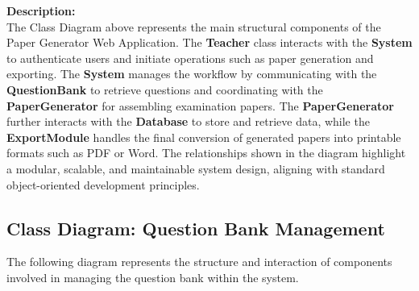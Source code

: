 \documentclass[12pt]{article}
\begin{document}
\begin{center}
\end{center}

\noindent
\textbf{Description:} \\
The Class Diagram above represents the main structural components of the Paper Generator Web Application. The \textbf{Teacher} class interacts with the \textbf{System} to authenticate users and initiate operations such as paper generation and exporting. The \textbf{System} manages the workflow by communicating with the \textbf{QuestionBank} to retrieve questions and coordinating with the \textbf{PaperGenerator} for assembling examination papers. The \textbf{PaperGenerator} further interacts with the \textbf{Database} to store and retrieve data, while the \textbf{ExportModule} handles the final conversion of generated papers into printable formats such as PDF or Word. The relationships shown in the diagram highlight a modular, scalable, and maintainable system design, aligning with standard object-oriented development principles.

\subsection{Class Diagram: Question Bank Management}

The following diagram represents the structure and interaction of components involved in managing the question bank within the system.
\end{document}
